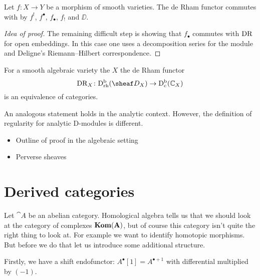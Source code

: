 \documentclass[number-in-sections,a4paper]{notes}
\begin{document}
\begin{Theorem}
    Let $f\colon X \to Y$ be a morphism of smooth varieties.
    The de Rham functor commutes with by $f^!$, $f^\bullet$, $f_\bullet$, $f_!$ and $\DD$.
\end{Theorem}

\begin{proof}[Idea of proof]
    The remaining difficult step is showing that $f_\bullet$ commutes with $\operatorname{DR}$ for open embeddings.
    In this case one uses a decomposition series for the module and Deligne's Riemann--Hilbert correspondence.
\end{proof}

\begin{Theorem}
    For a smooth algebraic variety the $X$ the de Rham functor
    \[
        \DR_X\colon \catDbDModrh{X} \to \catDbConstr{X}
    \]
    is an equivalence of categories.
\end{Theorem}

\begin{Remark}
    An analogous statement holds in the analytic context.
    However, the definition of regularity for analytic D-modules is different.
\end{Remark}

\begin{itemize}
    \item Outline of proof in the algebraic setting
    \item Perverse sheaves
\end{itemize}

\fi
\appendix

\section{Derived categories}
Let $\cat A$ be an abelian category.
Homological algebra tells us that we should look at the category of complexes $\mathbf{Kom}(\mathbf A)$, but of course this category isn't quite the right thing to look at.
For example we want to identify homotopic morphisms.
But before we do that let us introduce some additional structure.

Firstly, we have a shift endofunctor: $A^\bullet[1] = A^{\bullet + 1}$ with differential multiplied by $(-1)$.
\end{document}
